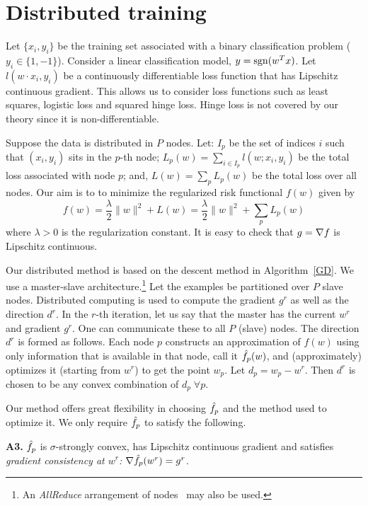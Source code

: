 \section{Distributed training}
\label{distr}

Let $\{x_i,y_i\}$ be the training set associated with a binary classification problem ($y_i\in\{1,-1\}$). Consider a linear classification model, $y=\operatorname{sgn}(w^Tx)$. Let $l(w\cdot x_i,y_i)$ be a continuously differentiable loss function that has Lipschitz continuous gradient. This allows us to consider loss functions such as least squares, logistic loss and squared hinge loss. Hinge loss is not covered by our theory since it is non-differentiable.

Suppose the data is distributed in $P$ nodes. Let: $I_p$ be the set of indices $i$ such that $(x_i,y_i)$ sits in the $p$-th node; $L_p(w) = \sum_{i\in I_p} l(w;x_i,y_i)$ be the total loss associated with node $p$; and, $L(w)=\sum_p L_p(w)$ be the total loss over all nodes. Our aim is to to minimize the regularized risk functional $f(w)$ given by
\begin{equation}
f(w) = \frac{\lambda}{2} \|w\|^2 + L(w) = \frac{\lambda}{2} \|w\|^2 + \sum_p L_p(w)
\label{risk}
\end{equation}
where $\lambda>0$ is the regularization constant. It is easy to check that $g=\nabla f$ is Lipschitz continuous.

Our distributed method is based on the descent method in Algorithm~\ref{GD}. We use a master-slave architecture.\footnote{An {\it AllReduce} arrangement of nodes~\cite{agarwal2011} may also be used.} Let the examples be partitioned over $P$ slave nodes. Distributed computing is used to compute the gradient $g^r$ as well as the direction $d^r$.  In the $r$-th iteration, let us say that the master has the current $w^r$ and gradient $g^r$. One can communicate these to all $P$ (slave) nodes. The direction $d^r$ is formed as follows. Each node $p$ constructs an approximation of $f(w)$ using only information that is available in that node, call it $\hat{f}_p(w)$, and (approximately) optimizes it (starting from $w^r$) to get the point $w_p$. Let $d_p=w_p-w^r$. Then $d^r$ is chosen to be any convex combination of $d_p\;\forall p$.

Our method offers great flexibility in choosing $\hat{f}_p$ and the method used to optimize it. We only require $\hat{f}_p$ to satisfy the following.

{\bf A3.} $\hat{f}_p$ is $\sigma$-strongly convex, has Lipschitz continuous gradient and satisfies {\it gradient consistency at $w^r$:} $\nabla\hat{f}_p(w^r)=g^r$.


